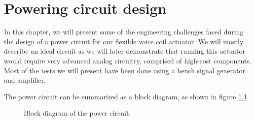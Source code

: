 
\chapter{Powering circuit design} %
\label{Chapter4}
In this chapter, we will present some of the engineering challenges faced during the design of a power circuit for our flexible voice coil actuator.
We will mostly describe an ideal circuit as we will later demonstrate that running this actuator would require very advanced analog circuitry, comprised of high-cost components.
Most of the tests we will present have been done using a bench signal generator and amplifier.


The power circuit can be summarized as a block diagram, as shown in figure \ref{fig:Power_Circuit_Block_Diagram}.
\begin{figure}[H]
    \centering
    \caption{Block diagram of the power circuit.}
    \label{fig:Power_Circuit_Block_Diagram}    
\end{figure}










